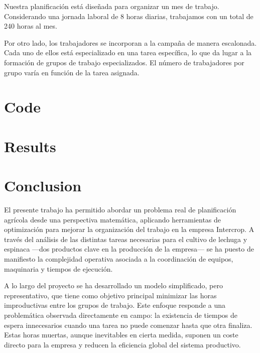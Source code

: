 Nuestra planificación está diseñada para organizar un mes de trabajo. Considerando una jornada laboral de 8 horas diarias, 
trabajamos con un total de 240 horas al mes.

Por otro lado, los trabajadores se incorporan a la campaña de manera escalonada. Cada uno de ellos está especializado en una 
tarea específica, lo que da lugar a la formación de grupos de trabajo especializados. El número de trabajadores por grupo varía 
en función de la tarea asignada.



\chapter*{Code}

\chapter*{Results}

\chapter*{Conclusion}
El presente trabajo ha permitido abordar un problema real de planificación agrícola desde una perspectiva matemática,
aplicando herramientas de optimización para mejorar la organización del trabajo en la empresa Intercrop.
A través del análisis de las distintas tareas necesarias para el cultivo de lechuga y espinaca —dos productos clave en la producción de la empresa—
se ha puesto de manifiesto la complejidad operativa asociada a la coordinación de equipos, maquinaria y tiempos de ejecución.

A lo largo del proyecto se ha desarrollado un modelo simplificado, pero representativo,
que tiene como objetivo principal minimizar las horas improductivas entre los grupos de trabajo.
Este enfoque responde a una problemática observada directamente en campo:
la existencia de tiempos de espera innecesarios cuando una tarea no puede comenzar hasta que otra finaliza.
Estas horas muertas, aunque inevitables en cierta medida, suponen un coste directo para la empresa y reducen la eficiencia global del sistema productivo.

